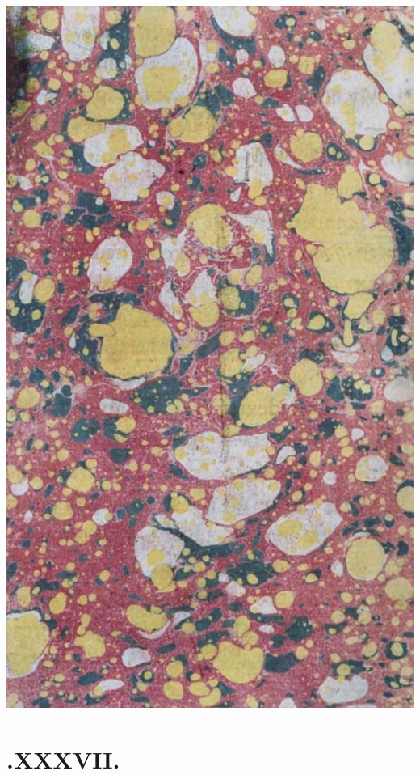 \documentclass[twoside]{article}
\begin{document}
\includegraphics[width=\hsize]{marble-verso}

\newpage
\section{.\quad  XXXVII.}

\vskip -12pt
\end{document}
